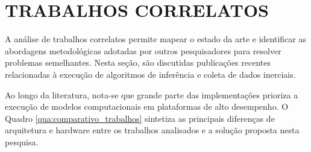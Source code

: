 
\chapter[Trabalhos Correlatos]{TRABALHOS CORRELATOS} \label{sec:trabalhos-correlatos}

A análise de trabalhos correlatos permite mapear o estado da arte e identificar as abordagens metodológicas adotadas por outros pesquisadores para resolver problemas semelhantes. Nesta seção, são discutidas publicações recentes relacionadas à execução de algoritmos de inferência e coleta de dados inerciais.

Ao longo da literatura, nota-se que grande parte das implementações prioriza a execução de modelos computacionais em plataformas de alto desempenho. O Quadro \ref{qua:comparativo_trabalhos} sintetiza as principais diferenças de arquitetura e hardware entre os trabalhos analisados e a solução proposta nesta pesquisa.


